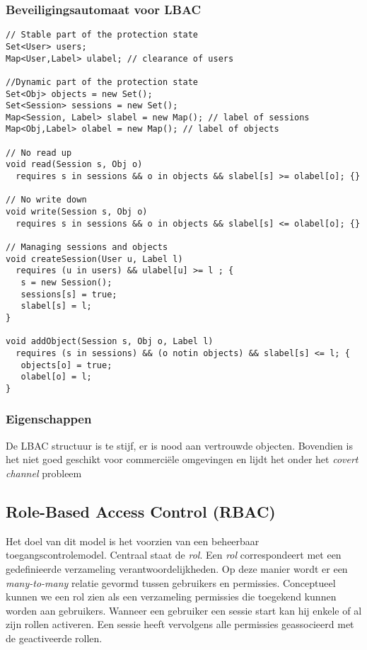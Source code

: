 \documentclass[../main.tex]{subfiles}
\begin{document}
\subsubsection{Beveiligingsautomaat voor LBAC}
\begin{lstlisting}[caption=LBAC Automaat]
// Stable part of the protection state
Set<User> users;
Map<User,Label> ulabel; // clearance of users

//Dynamic part of the protection state
Set<Obj> objects = new Set();
Set<Session> sessions = new Set();
Map<Session, Label> slabel = new Map(); // label of sessions
Map<Obj,Label> olabel = new Map(); // label of objects

// No read up
void read(Session s, Obj o)
  requires s in sessions && o in objects && slabel[s] >= olabel[o]; {}

// No write down
void write(Session s, Obj o)
  requires s in sessions && o in objects && slabel[s] <= olabel[o]; {}
  
// Managing sessions and objects
void createSession(User u, Label l)
  requires (u in users) && ulabel[u] >= l ; {
   s = new Session();
   sessions[s] = true;
   slabel[s] = l;
}

void addObject(Session s, Obj o, Label l)
  requires (s in sessions) && (o notin objects) && slabel[s] <= l; {
   objects[o] = true;
   olabel[o] = l;
}
\end{lstlisting}

\subsubsection{Eigenschappen}
De LBAC structuur is te stijf, er is nood aan vertrouwde objecten. Bovendien is het niet goed geschikt voor commerci\"ele omgevingen en lijdt het onder het \textit{covert channel} probleem

\subsection{Role-Based Access Control (RBAC)}
Het doel van dit model is het voorzien van een beheerbaar toegangscontrolemodel. Centraal staat de \textit{rol}. Een \textit{rol} correspondeert met een gedefinieerde verzameling verantwoordelijkheden. Op deze manier wordt er een \textit{many-to-many} relatie gevormd tussen gebruikers en permissies. Conceptueel kunnen we een rol zien als een verzameling permissies die toegekend kunnen worden aan gebruikers. Wanneer een gebruiker een sessie start kan hij enkele of al zijn rollen activeren. Een sessie heeft vervolgens alle permissies geassocieerd met de geactiveerde rollen.
\end{document}
